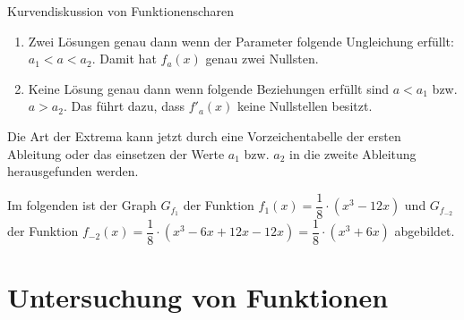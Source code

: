 \begin{bsp}{Kurvendiskussion von Funktionenscharen}{}
\begin{itemize}
\begin{enumerate}
Damit hat $f'_a(x)$ genau eine Nullstelle wenn der Parameter $a$ den Wert  $a= a_1$ bzw. $a = a_2$ annimmt.
\item Zwei Lösungen genau dann wenn der Parameter folgende Ungleichung erfüllt: $a_1<a<a_2$. Damit hat $f_a(x)$ genau zwei Nullsten.
\item Keine Lösung genau dann wenn folgende Beziehungen erfüllt sind $a<a_1$ bzw. $a>a_2$. Das führt dazu, dass $f'_a(x)$ keine Nullstellen besitzt.
    \end{enumerate}
Die Art der Extrema kann jetzt durch eine Vorzeichentabelle der ersten Ableitung oder das einsetzen der Werte $a_1$ bzw. $a_2$ in die zweite Ableitung herausgefunden werden. 
\end{itemize}
Im folgenden ist der Graph $G_{f_1}$ der Funktion $f_1(x) = \dfrac{1}{8}\cdot(x^3-12x)$ und $G_{f_{-2}}$  der Funktion $f_{-2}(x)= \dfrac{1}{8} \cdot(x^3 -6x+12x-12x) = \dfrac{1}{8}\cdot(x^3+6x)$ abgebildet.
\begin{center}
\end{center}
\end{bsp}
\section{Untersuchung von Funktionen}
